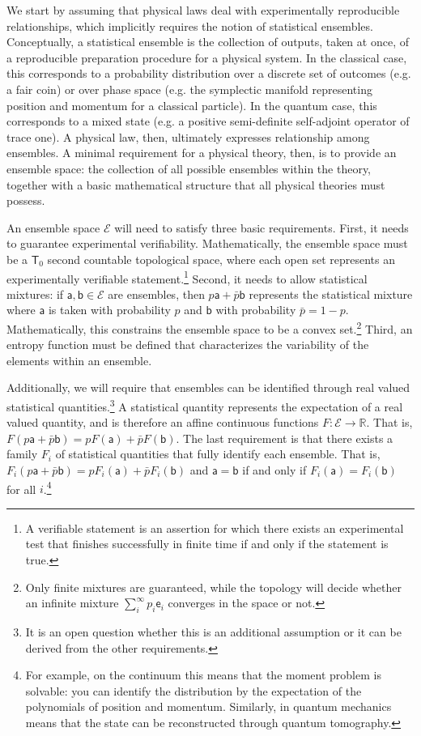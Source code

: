 \documentclass[10pt,twocolumn, nofootinbib]{revtex4-2}
\newcommand{\ens}[1][e] {\mathsf{#1}} %
\newcommand{\Ens}[1][E] {\mathcal{#1}} %
\begin{document}
We start by assuming that physical laws deal with experimentally reproducible relationships, which implicitly requires the notion of statistical ensembles. Conceptually, a statistical ensemble is the collection of outputs, taken at once, of a reproducible preparation procedure for a physical system. In the classical case, this corresponds to a probability distribution over a discrete set of outcomes (e.g. a fair coin) or over phase space (e.g. the symplectic manifold representing position and momentum for a classical particle). In the quantum case, this corresponds to a mixed state (e.g. a positive semi-definite self-adjoint operator of trace one). A physical law, then, ultimately expresses relationship among ensembles. A minimal requirement for a physical theory, then, is to provide an ensemble space: the collection of all possible ensembles within the theory, together with a basic mathematical structure that all physical theories must possess.

An ensemble space $\Ens$ will need to satisfy three basic requirements. First, it needs to guarantee experimental verifiability. Mathematically, the ensemble space must be a $\mathsf{T}_0$ second countable topological space, where each open set represents an experimentally verifiable statement.\footnote{A verifiable statement is an assertion for which there exists an experimental test that finishes successfully in finite time if and only if the statement is true.} Second, it needs to allow statistical mixtures: if $\ens[a],\ens[b] \in \Ens$ are ensembles, then $p \ens[a] + \bar{p} \ens[b]$ represents the statistical mixture where $\ens[a]$ is taken with probability $p$ and $\ens[b]$ with probability $\bar{p} = 1 - p$. Mathematically, this constrains the ensemble space to be a convex set.\footnote{Only finite mixtures are guaranteed, while the topology will decide whether an infinite mixture $\sum_{i}^{\infty} p_i \ens_i$ converges in the space or not.} Third, an entropy function must be defined that characterizes the variability of the elements within an ensemble.

Additionally, we will require that ensembles can be identified through real valued statistical quantities.\footnote{It is an open question whether this is an additional assumption or it can be derived from the other requirements.} A statistical quantity represents the expectation of a real valued quantity, and is therefore an affine continuous functions $F : \Ens \to \mathbb{R}$. That is, $F(p \ens[a] + \bar{p} \ens[b]) = p F(\ens[a]) + \bar{p} F(\ens[b])$. The last requirement is that there exists a family $F_i$ of statistical quantities that fully identify each ensemble. That is, $F_i(p \ens[a] + \bar{p} \ens[b]) = p F_i(\ens[a]) + \bar{p} F_i(\ens[b])$ and $\ens[a] = \ens[b]$ if and only if $F_i(\ens[a]) = F_i(\ens[b])$ for all $i$.\footnote{For example, on the continuum this means that the moment problem is solvable: you can identify the distribution by the expectation of the polynomials of position and momentum. Similarly, in quantum mechanics means that the state can be reconstructed through quantum tomography.}
\end{document}
